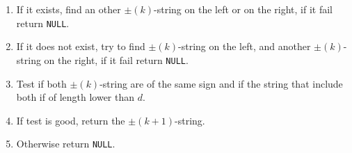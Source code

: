 \begin{itemize}
\begin{enumerate}
\begin{enumerate}
                        \item \label{alg:step3:2} If it exists, find an other $\pm(k)$-string on the left or on the right, if it fail return \texttt{NULL}.
                        \item \label{alg:step3:3} If it does not exist, try to find $\pm(k)$-string on the left, and another $\pm(k)$-string on the right, if it fail return \texttt{NULL}.
                        \item \label{alg:step3:4} Test if both $\pm(k)$-string are of the same sign and if the string that include both if of length lower than $d$.
                        \item \label{alg:step3:5}If test is good, return the $\pm(k+1)$-string.
                        \item \label{alg:step3:6}Otherwise return \texttt{NULL}.
                    \end{enumerate}
          \end{enumerate}


\end{itemize}
